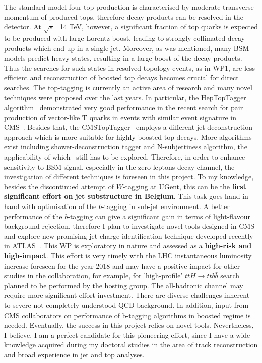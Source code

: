 \textcolor{\mynew}{
The standard model four top production is characterised by moderate transverse momentum of produced tops, therefore decay products can be resolved in the detector. At $\sqrt{s}$=14 TeV, however, a significant fraction of top quarks is expected to be produced with large Lorentz-boost, leading to strongly collimated decay products which end-up in a single jet. 
Moreover, as was mentioned, many BSM models predict heavy states, resulting in a large boost of the decay products. Thus the searches for such states in resolved topology events, as in WP1, are less efficient and reconstruction of boosted top decays becomes crucial for direct searches. 
}
\textcolor{\mynew}{
The top-tagging is currently an active area of research and many novel techniques were proposed over the last years. In particular, the HepTopTagger algorithm~\cite{heptoptagger} demonstrated very good performance in the recent search for pair production of vector-like T quarks in events with similar event signature in CMS~\cite{Khachatryan:2015oba}. Besides that, the CMSTopTagger~\cite{Kaplan:2008ie} employs a different jet deconstruction approach which is more suitable for highly boosted top decays. More algorithms exist including shower-deconstruction tagger and N-subjettiness algorithm, the applicability of which~\cite{CMS:2014fya} still has to be explored. Therefore, in order to enhance sensitivity to BSM \fourtop signal, especially in the zero-leptons decay channel, the investigation of different techniques is foreseen in this project. To my knowledge, besides the discontinued attempt of $W$-tagging at UGent, this can be the \textbf{first significant effort on jet substructure in Belgium}.
}
\textcolor{\mycolor}{
This task goes hand-in-hand with optimisation of the $b$-tagging in sub-jet environment. A better performance of the $b$-tagging can give a significant gain in terms of light-flavour background rejection, therefore I plan to investigate novel tools designed in CMS~\cite{Bertolini:2014bba} and explore new promising jet-charge identification technique developed recently in ATLAS~\cite{Aad:2015cua,ATLAS:2015jetcharge}.
}
\textcolor{\mycolor}{
This WP is exploratory in nature and assessed as a \textbf{high-risk and high-impact}. This effort is very timely with the LHC instantaneous luminosity increase foreseen for the year 2018 and may have a positive impact for other studies in the collaboration, for example, for 'high-profile' $ttH \rightarrow ttb\bar{b}$ search planned to be performed by the hosting group. The all-hadronic channel may require more significant effort investment. There are diverse challenges inherent to severe not completely understood QCD background. In addition, input from CMS collaborators on performance of b-tagging algorithms in boosted regime is needed. Eventually, the success in this project relies on novel tools. Nevertheless, I believe, I am a perfect candidate for this pioneering effort, since I have a wide knowledge acquired during my doctoral studies in the area of track reconstruction and broad experience in jet and top analyses.
}
